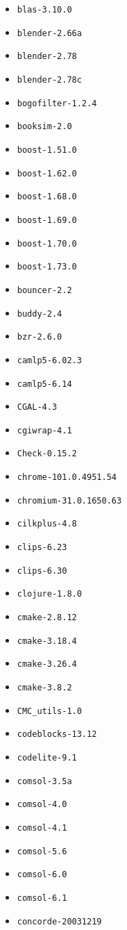 \begin{multicols}{3}
\begin{itemize}
\item \verb|blas-3.10.0|
\item \verb|blender-2.66a|
\item \verb|blender-2.78|
\item \verb|blender-2.78c|
\item \verb|bogofilter-1.2.4|
\item \verb|booksim-2.0|
\item \verb|boost-1.51.0|
\item \verb|boost-1.62.0|
\item \verb|boost-1.68.0|
\item \verb|boost-1.69.0|
\item \verb|boost-1.70.0|
\item \verb|boost-1.73.0|
\item \verb|bouncer-2.2|
\item \verb|buddy-2.4|
\item \verb|bzr-2.6.0|
\item \verb|camlp5-6.02.3|
\item \verb|camlp5-6.14|
\item \verb|CGAL-4.3|
\item \verb|cgiwrap-4.1|
\item \verb|Check-0.15.2|
\item \verb|chrome-101.0.4951.54|
\item \verb|chromium-31.0.1650.63|
\item \verb|cilkplus-4.8|
\item \verb|clips-6.23|
\item \verb|clips-6.30|
\item \verb|clojure-1.8.0|
\item \verb|cmake-2.8.12|
\item \verb|cmake-3.18.4|
\item \verb|cmake-3.26.4|
\item \verb|cmake-3.8.2|
\item \verb|CMC_utils-1.0|
\item \verb|codeblocks-13.12|
\item \verb|codelite-9.1|
\item \verb|comsol-3.5a|
\item \verb|comsol-4.0|
\item \verb|comsol-4.1|
\item \verb|comsol-5.6|
\item \verb|comsol-6.0|
\item \verb|comsol-6.1|
\item \verb|concorde-20031219|

\end{itemize}
\end{multicols}

